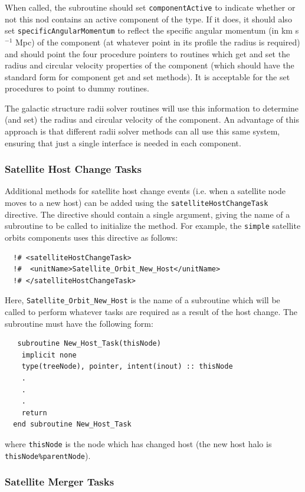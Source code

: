 When called, the subroutine should set {\tt componentActive} to indicate whether or not this nod contains an active component of the type. If it does, it should also set {\tt specificAngularMomentum} to reflect the specific angular momentum (in km s$^{-1}$ Mpc) of the component (at whatever point in its profile the radius is required) and should point the four procedure pointers to routines which get and set the radius and circular velocity properties of the component (which should have the standard form for component get and set methods). It is acceptable for the set procedures to point to dummy routines.

The galactic structure radii solver routines will use this information to determine (and set) the radius and circular velocity of the component. An advantage of this approach is that different radii solver methods can all use this same system, ensuring that just a single interface is needed in each component.

\subsubsection{Satellite Host Change Tasks}

Additional methods for satellite host change events (i.e. when a satellite node moves to a new host) can be added using the {\tt satelliteHostChangeTask} directive. The directive should contain a single argument, giving the name of a subroutine to be called to initialize the method. For example, the {\tt simple} satellite orbits components uses this directive as follows:
\begin{verbatim}
  !# <satelliteHostChangeTask>
  !#  <unitName>Satellite_Orbit_New_Host</unitName>
  !# </satelliteHostChangeTask>
\end{verbatim}
Here, {\tt Satellite\_Orbit\_New\_Host} is the name of a subroutine which will be called to perform whatever tasks are required as a result of the host change. The subroutine must have the following form:
\begin{verbatim}
   subroutine New_Host_Task(thisNode)
    implicit none
    type(treeNode), pointer, intent(inout) :: thisNode
    .
    .
    .
    return
  end subroutine New_Host_Task
\end{verbatim}
where {\tt thisNode} is the node which has changed host (the new host halo is {\tt thisNode\%parentNode}).

\subsubsection{Satellite Merger Tasks}

